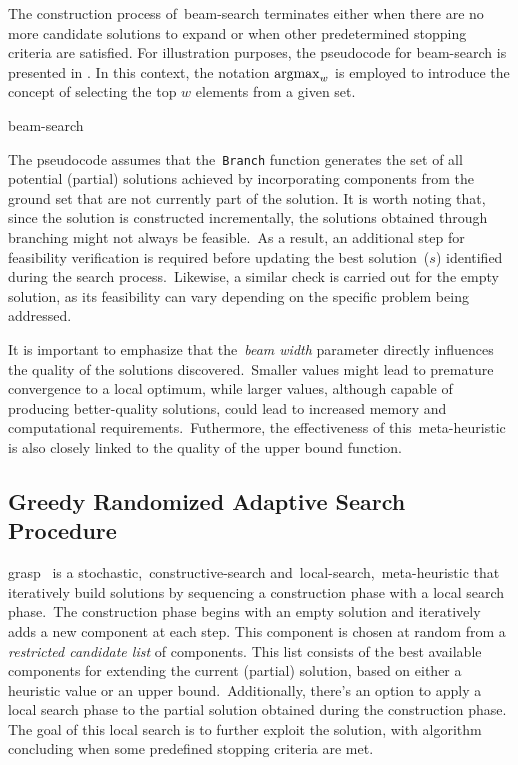 The construction process of~\acrshort{beam-search} terminates either when there
are no more candidate solutions to expand or when other predetermined stopping
criteria are satisfied. For illustration purposes, the pseudocode for
\acrshort{beam-search} is presented in .
In this context, the notation $\operatorname*{argmax}_{w}$ is employed to introduce the concept
of selecting the top $w$ elements from a given set.

\begin{algorithm}[h]
  
  \caption{\acrlong{beam-search}}
  \label{algorithm:beam-search}
\end{algorithm}

The pseudocode assumes that the~\texttt{Branch} function generates the set of
all potential (partial) solutions achieved by incorporating components from the
ground set that are not currently part of the solution. It is worth noting that,
since the solution is constructed incrementally, the solutions obtained through
branching might not always be feasible.~As a result, an additional step for
feasibility verification is required before updating the best solution~($s$)
identified during the search process.~Likewise, a similar check is carried
out for the empty solution, as its feasibility can vary depending on the
specific problem being addressed.

It is important to emphasize that the~\emph{beam width} parameter directly
influences the quality of the solutions discovered.~Smaller values might lead to
premature convergence to a local optimum, while larger values, although capable
of producing better-quality solutions, could lead to increased memory and
computational requirements.~Futhermore, the effectiveness of
this~\acrshort{meta-heuristic} is also closely linked to the quality of the
upper bound function.

\subsection{Greedy Randomized Adaptive Search Procedure}
\label{subsec:grasp}

\acrfull{grasp}~\cite{resende2010greedya,outeiro2021application,blum2003metaheuristics}
is a stochastic,~\acrshort{constructive-search}
and~\acrshort{local-search},~\acrshort{meta-heuristic} that iteratively build
solutions by sequencing a construction phase with a local search phase.~The
construction phase begins with an empty solution and iteratively adds a new
component at each step. This component is chosen at random from a
\emph{restricted candidate list} of components. This list consists of the best
available components for extending the current (partial) solution, based on
either a heuristic value or an upper bound.~Additionally, there's an option to
apply a local search phase to the partial solution obtained during the
construction phase. The goal of this local search is to further exploit the
solution, with algorithm concluding when some predefined stopping criteria are
met.

